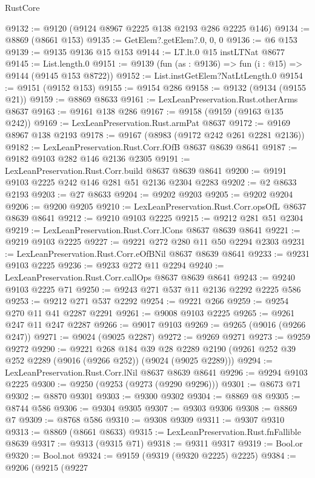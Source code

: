 \begin{lexlean}{RustCore}
\begin{coremodule}
@9132 := @9120 (@9124 @8967 @2225 @138 @2193 @286 @2225 @146)
@9134 := @8869 (@8661 @153)
@9135 := GetElem?.getElem?.{0, 0, 0}
@9136 := @6 @153
@9139 := @9135 @9136 @15 @153
@9144 := LT.lt.{0} @15 instLTNat @8677
@9145 := List.length.{0}
@9151 := @9139 (fun (as : @9136) => fun (i : @15) => @9144 (@9145 @153 @8722))
@9152 := List.instGetElem?NatLtLength.{0}
@9154 := @9151 (@9152 @153)
@9155 := @9154 @286
@9158 := @9132 (@9134 (@9155 @21))
@9159 := @8869 @8633
@9161 := LexLeanPreservation.Rust.otherArms @8637
@9163 := @9161 @138 @286
@9167 := @9158 (@9159 (@9163 @135 @242))
@9169 := LexLeanPreservation.Rust.armPat @8637
@9172 := @9169 @8967 @138 @2193
@9178 := @9167 (@8983 (@9172 @242 @261 @2281 @2136))
@9182 := LexLeanPreservation.Rust.Corr.fOfB @8637 @8639 @8641
@9187 := @9182 @9103 @282 @146 @2136 @2305
@9191 := LexLeanPreservation.Rust.Corr.build @8637 @8639 @8641
@9200 := @9191 @9103 @2225 @242 @146 @281 @51 @2136 @2304 @2283
@9202 := @2 @8633 @2193
@9203 := @27 @8633
@9204 := @9202 @9203
@9205 := @9202 @9204
@9206 := @9200 @9205
@9210 := LexLeanPreservation.Rust.Corr.opsOfL @8637 @8639 @8641
@9212 := @9210 @9103 @2225
@9215 := @9212 @281 @51 @2304
@9219 := LexLeanPreservation.Rust.Corr.lCons @8637 @8639 @8641
@9221 := @9219 @9103 @2225
@9227 := @9221 @272 @280 @11 @50 @2294 @2303
@9231 := LexLeanPreservation.Rust.Corr.eOfBNil @8637 @8639 @8641
@9233 := @9231 @9103 @2225
@9236 := @9233 @272 @11 @2294
@9240 := LexLeanPreservation.Rust.Corr.callOps @8637 @8639 @8641
@9243 := @9240 @9103 @2225 @71
@9250 := @9243 @271 @537 @11 @2136 @2292 @2225 @586
@9253 := @9212 @271 @537 @2292
@9254 := @9221 @266
@9259 := @9254 @270 @11 @41 @2287 @2291
@9261 := @9008 @9103 @2225
@9265 := @9261 @247 @11 @247 @2287
@9266 := @9017 @9103
@9269 := @9265 (@9016 (@9266 @247))
@9271 := @9024 (@9025 @2287)
@9272 := @9269 @9271
@9273 := @9259 @9272
@9290 := @9221
    @268
    @184
    @39
    @28
    @2289
    @2190
    (@9261 @252 @39 @252 @2289 (@9016 (@9266 @252)) (@9024 (@9025 @2289)))
@9294 := LexLeanPreservation.Rust.Corr.lNil @8637 @8639 @8641
@9296 := @9294 @9103 @2225
@9300 := @9250 (@9253 (@9273 (@9290 @9296)))
@9301 := @8673 @71
@9302 := @8870 @9301
@9303 := @9300 @9302
@9304 := @8869 @8
@9305 := @8744 @586
@9306 := @9304 @9305
@9307 := @9303 @9306
@9308 := @8869 @7
@9309 := @8768 @586
@9310 := @9308 @9309
@9311 := @9307 @9310
@9313 := @8869 (@8661 @8633)
@9315 := LexLeanPreservation.Rust.fnFallible @8639
@9317 := @9313 (@9315 @71)
@9318 := @9311 @9317
@9319 := Bool.or
@9320 := Bool.not
@9324 := @9159 (@9319 (@9320 @2225) @2225)
@9384 := @9206
    (@9215
      (@9227

\end{coremodule}
\end{lexlean}
